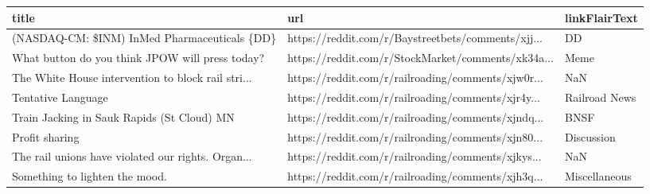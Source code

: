 \documentclass{article}%
\begin{document}
\begin{table}[htbp]%
\centering%
\begin{adjustbox}{width=1\textwidth}%
\begin{tabular}{lll}
\toprule
                                             title &                                                url & linkFlairText \\
\midrule
      (NASDAQ-CM: \$INM) InMed Pharmaceuticals \{DD\} & https://reddit.com/r/Baystreetbets/comments/xjj... &            DD \\
   What button do you think JPOW will press today? & https://reddit.com/r/StockMarket/comments/xk34a... &          Meme \\
The White House intervention to block rail stri... & https://reddit.com/r/railroading/comments/xjw0r... &           NaN \\
                                Tentative Language & https://reddit.com/r/railroading/comments/xjr4y... & Railroad News \\
        Train Jacking in Sauk Rapids (St Cloud) MN & https://reddit.com/r/railroading/comments/xjndq... &          BNSF \\
                                    Profit sharing & https://reddit.com/r/railroading/comments/xjn80... &    Discussion \\
The rail unions have violated our rights. Organ... & https://reddit.com/r/railroading/comments/xjkys... &           NaN \\
                    Something to lighten the mood. & https://reddit.com/r/railroading/comments/xjh3q... & Miscellaneous \\
\bottomrule
\end{tabular}
%
\end{adjustbox}%
\end{table}

%
\end{document}

